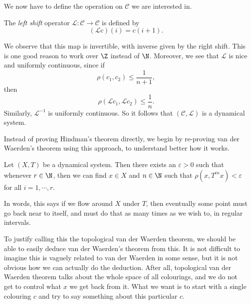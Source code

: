 \documentclass[a4paper]{article}
\begin{document}
We now have to define the operation on $\mathcal{C}$ we are interested in.
\begin{defi}
  The \emph{left shift} operator $\mathcal{L}: \mathcal{C} \to \mathcal{C}$ is defined by
  \[
    (\mathcal{L}c)(i) = c(i + 1).
  \]
\end{defi}
\begin{center}
\end{center}
We observe that this map is invertible, with inverse given by the right shift. This is one good reason to work over $\Z$ instead of $\N$. Moreover, we see that $\mathcal{L}$ is nice and uniformly continuous, since if
\[
  \rho(c_1, c_2) \leq \frac{1}{n + 1},
\]
then
\[
  \rho(\mathcal{L} c_1, \mathcal{L} c_2) \leq \frac{1}{n}.
\]
Similarly, $\mathcal{L}^{-1}$ is uniformly continuous. So it follows that $(\mathcal{C}, \mathcal{L})$ is a dynamical system.

Instead of proving Hindman's theorem directly, we begin by re-proving van der Waerden's theorem using this approach, to understand better how it works.

\begin{thm}
  Let $(X, T)$ be a dynamical system. Then there exists an $\varepsilon > 0$ such that whenever $r \in\N$, then we can find $x \in X$ and $n \in \N$ such that $\rho(x, T^{in} x) < \varepsilon$ for all $i = 1, \cdots, r$.
\end{thm}
In words, this says if we flow around $X$ under $T$, then eventually some point must go back near to itself, and must do that as many times as we wish to, in regular intervals.

To justify calling this the topological van der Waerden theorem, we should be able to easily deduce van der Waerden's theorem from this. It is not difficult to imagine this is vaguely related to van der Waerden in some sense, but it is not obvious how we can actually do the deduction. After all, topological van der Waerden theorem talks about the whole space of all colourings, and we do not get to control what $x$ we get back from it. What we want is to start with a single colouring $c$ and try to say something about this particular $c$.
\end{document}
